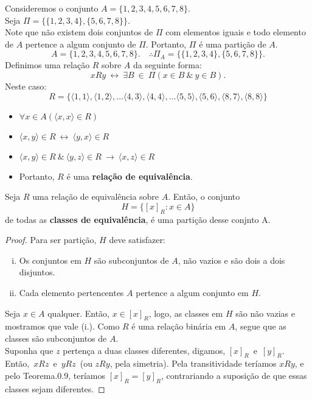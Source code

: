          \begin{exmp}
            Consideremos o conjunto $A = \{1,2,3,4,5,6,7,8\}.$\\
            Seja $\Pi = \{\{1,2,3,4\},\{5,6,7,8\}\}.$\\
            Note que não existem dois conjuntos de $\Pi$ com elementos iguais e todo elemento de $A$ pertence a algum conjunto de $\Pi$. Portanto, $\Pi$ é uma partição de $A$.
            $$A = \{1,2,3,4,5,6,7,8\}.\quad \therefore \Pi_{A} = \{\{1,2,3,4\},\{5,6,7,8\}\}.$$
            Definimos uma relação $R$ sobre $A$ da seguinte forma:
            $$xRy\ \leftrightarrow\ \exists B\ \in\ \Pi (x \in B\ \&\ y \in B).$$
            Neste caso:
            $$R = \{\langle 1, 1 \rangle ,\langle 1, 2 \rangle , \dots \langle 4, 3 \rangle , \langle 4, 4 \rangle , \dots \langle 5, 5 \rangle , \langle 5, 6 \rangle , \langle 8, 7 \rangle , \langle 8, 8 \rangle \}$$
            \begin{itemize}
               \item $\forall x \in A(\langle x, x \rangle \in R)$
               \item $\langle x, y \rangle \in R\ \leftrightarrow\ \langle y, x \rangle \in R$
               \item $\langle x, y \rangle \in R\ \&\ \langle y, z \rangle \in R\ \rightarrow\ \langle x, z \rangle \in R$
               \item Portanto, $R$ é uma \textbf{relação de equivalência}.
            \end{itemize}    
         \end{exmp}
         \begin{theorem}
            Seja $R$ uma relação de equivalência sobre $A$. Então, o conjunto
            $$H = \{[x]_{R}: x \in A\}$$
            de todas as \textbf{classes de equivalência}, é uma partição desse conjnto A.  
         \end{theorem}
         \begin{proof}
            Para ser partição, $H$ deve satisfazer:
            \begin{enumerate}[i.]
               \item Os conjuntos em $H$ são subconjuntos de $A$, não vazios e são dois a dois disjuntos.
               \item Cada elemento pertencentes $A$ pertence a algum conjunto em $H$.
            \end{enumerate}
            Seja $x \in A$ qualquer. Então, $x \in [x]_{R}$, logo, as classes em $H$ são não vazias e mostramos que vale (i.). Como $R$ é uma relação binária em $A$, segue que as classes são subconjuntos de $A$.\\
            Suponha que $z$ pertença a duas classes diferentes, digamos, $[x]_{R}$\ e\ $[y]_{R}$. Então,\ $xRz$\ e\ $yRz$\ (ou $zRy$, pela simetria). Pela transitividade teríamos $xRy$, e pelo Teorema.0.9, teríamos $[x]_{R} = [y]_{R}$, contrariando a suposição de que essas classes sejam diferentes.
         \end{proof}
